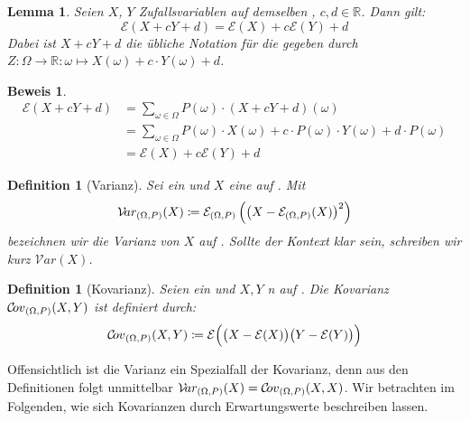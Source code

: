 \documentclass[a4paper]{article}
\newtheorem{lemma}[satz]{Lemma}
\newtheorem{definition}[satz]{Definition} %
\theoremstyle{nonumberplain}
\newtheorem{beweis}{Beweis}
\begin{document}
	\begin{lemma} \label{lem-explin}
		Seien $X$, $Y$ Zufallsvariablen auf demselben \probspace{}, $c,d \in \mathbb{R}$. Dann gilt:
		\begin{equation}
		\mathcal{E}(X + cY + d) = \mathcal{E}(X) + c \mathcal{E}(Y) + d \label{eq-linearity}
		\end{equation}
		Dabei ist  $X + cY + d$ die übliche Notation für die \rvar{} gegeben durch $Z : \Omega \to \mathbb{R} : \omega \mapsto X(\omega) + c \cdot Y(\omega)+ d$.
	\end{lemma}
	\begin{beweis}
		\begin{align}
		\mathcal{E}(X + cY + d) & = \sum_{\omega \in \Omega}{P(\omega) \cdot (X + cY + d)(\omega) } \nonumber \\
		& = \sum_{\omega \in \Omega}{P(\omega) \cdot X(\omega) + c \cdot P(\omega) \cdot Y(\omega) + d \cdot P(\omega)} \nonumber \\
		& = \mathcal{E}(X) + c \mathcal{E}(Y) + d \nonumber
		\end{align}
	\end{beweis}
	\newcommand{\var}{Varianz}
	\newcommand{\mvar}{\mathcal{V}\!ar}
	\begin{definition}[\var]\label{def-var}
		Sei \probspaceex{} ein \probspace{} und $X$ eine \rvar{} auf \probspaceex{}. Mit
		\begin{equation}
		\mvar_{\probspaceexraw{}}(X) \coloneqq  \mathcal{E}_{\probspaceexraw{}}\left(\left(X - \mathcal{E}_{\probspaceexraw{}} (X)\right)^{2}\right)
		\end{equation}
		bezeichnen wir die \var{} von $X$ auf  \probspaceex{}. Sollte der Kontext \probspaceex{} klar sein, schreiben wir kurz $\mvar(X)$.
	\end{definition}
	\newcommand{\cov}{Kovarianz}
	\newcommand{\mcov}{\mathcal{C}\!ov}
	\begin{definition}[\cov]\label{def-cov}
		Seien \probspaceex{} ein \probspace{} und $X, Y$ \rvar n auf \probspaceex{}. Die \cov{} $\mcov{}_{\probspaceexraw}(X,Y)$ ist definiert durch:
		\begin{equation}
		\mcov{}_{\probspaceexraw}(X,Y) \coloneqq \mathcal{E} \Big( \big(X - \mathcal{E}(X)\big)\big(Y - \mathcal{E}(Y) \big)\Big)
		\end{equation}
	\end{definition}
	
	Offensichtlich ist die \var{} ein Spezialfall der \cov{}, denn aus den Definitionen folgt unmittelbar $\mvar_{\probspaceexraw}(X) = \mcov{}_{\probspaceexraw}(X,X)$. Wir betrachten im Folgenden, wie sich Kovarianzen durch Erwartungswerte beschreiben lassen.
	
\end{document}
